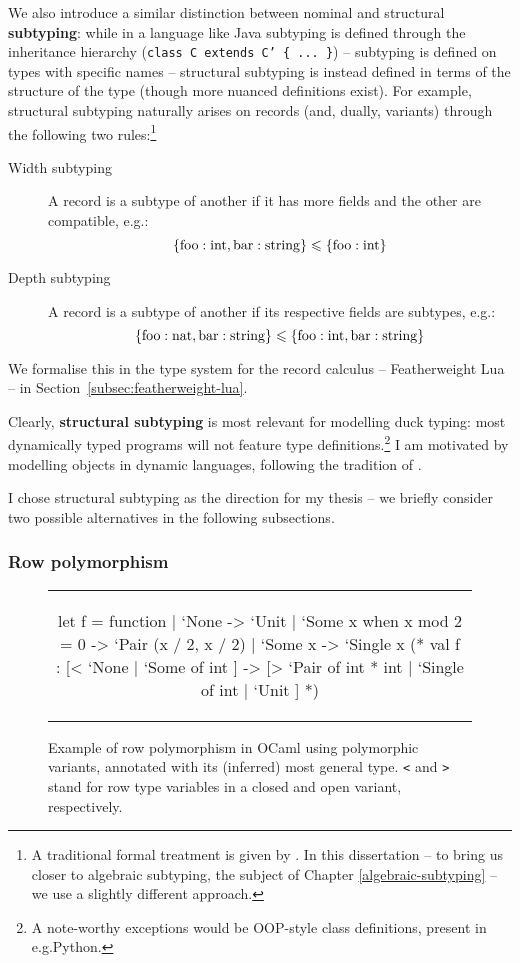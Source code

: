 We also introduce a similar distinction between nominal and structural \textbf{subtyping}: while in a language like Java subtyping is defined through the inheritance hierarchy (\texttt{class C extends C' \{ ... \}}) -- subtyping is defined on types with specific names -- structural subtyping is instead defined in terms of the structure of the type (though more nuanced definitions exist). For example, structural subtyping naturally arises on records (and, dually, variants) through the following two rules:\footnote{A traditional formal treatment is given by \textcite{pierce-book}. In this dissertation -- to bring us closer to algebraic subtyping, the subject of Chapter \ref{algebraic-subtyping} -- we use a slightly different approach.}
\begin{description}
    \item[Width subtyping] A record is a subtype of another if it has more fields and the other are compatible, e.g.: $$ \{ \mathrm{foo} : \mathrm{int}, \mathrm{bar} : \mathrm{string} \} \leqslant \{ \mathrm{foo} : \mathrm{int} \} $$
    \item[Depth subtyping] A record is a subtype of another if its respective fields are subtypes, e.g.:
    $$ \{ \mathrm{foo}: \mathrm{nat}, \mathrm{bar}: \mathrm{string} \} \leqslant \{ \mathrm{foo}: \mathrm{int}, \mathrm{bar}: \mathrm{string} \} $$
\end{description}
We formalise this in the type system for the record calculus -- Featherweight Lua -- in Section~\ref{subsec:featherweight-lua}.

Clearly, \textbf{structural subtyping} is most relevant for modelling duck typing: most dynamically typed programs will not feature type definitions.\footnote{A note-worthy exceptions would be OOP-style class definitions, present in e.g.\@ Python.} I am motivated by modelling objects in dynamic languages, following the tradition of \textcite{cardelli-multiple-inheritance}.

I chose structural subtyping as the direction for my thesis -- we briefly consider two possible alternatives in the following subsections.

\subsubsection{Row polymorphism}

\begin{figure}
    \centering
    \begin{tabular}{c}
    \begin{ocaml}
let f = function 
    | `None -> `Unit 
    | `Some x when x mod 2 = 0 -> `Pair (x / 2, x / 2) 
    | `Some x -> `Single x
(* 
val f : [< `None | `Some of int ] 
     -> [> `Pair of int * int | `Single of int | `Unit ]
*)
    \end{ocaml}
    \end{tabular}
    \caption{Example of row polymorphism in OCaml using polymorphic variants, annotated with its (inferred) most general type. \texttt{<} and \texttt{>} stand for row type variables in a closed and open variant, respectively.}
    \label{fig:ocaml-row-polymorphism}
\end{figure}

